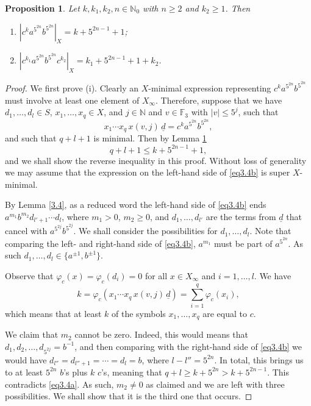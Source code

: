 \documentclass[twoside,11pt]{amsart}
\numberwithin{equation}{section}
\newtheorem{proposition}[theorem]{Proposition}
\theoremstyle{definition}
\newcommand {\N}{\mathbb N}
\newcommand{\1}{\mathbbm{1}}
\newcommand{\F}{\mathbb F}
\newcommand{\pdt}{\underline}
\begin{document}
	\begin{proposition}		\label{3.5}
		Let $k, k_1, k_2, n \in \N_0$ with $n \geq 2$ and $k_2 \geq 1$. Then 
		\begin{enumerate}
			\item[ \rm (i)] $|c^k a^{5^{2n}} b^{5^{2n}}|_X = k + 5^{2n-1} +1$;
			\item[ \rm (ii)] $|c^{k_1} a^{5^{2n}} b^{5^{2n}}c^{k_2}|_X =  k_1+ 5^{2n-1} +1 + k_2$.
		\end{enumerate}
	\end{proposition}
	
	\begin{proof}
		We first prove (i). Clearly an $X$-minimal expression representing $c^k a^{5^{2n}} b^{5^{2n}}$ must involve at least one element of $X_\infty$.
		Therefore, suppose that we have
		$d_1, \ldots, d_l \in S$, $x_1, \ldots ,x_q \in X$, and $j \in \N$ and $ v \in \F_3$ with $|v| \leq 5^j$, such that 
		\begin{equation} 	\label{eq3.4b}
			x_1 \cdots x_q \, x(v,j) \, \pdt{d} = c^k a^{5^{2n}} b^{5^{2n}},
		\end{equation}
		and such that $q+l+1$ is minimal. Then by Lemma \ref{3.5}
		\begin{equation}		\label{eq3.4a}
			q+l+1 \leq k+ 5^{2n-1} +1,
		\end{equation}
		and we shall show the reverse inequality in this proof.
		Without loss of generality we may assume that the expression on the left-hand side of \eqref{eq3.4b} is super $X$-minimal.
		
		By Lemma \ref{3.4}, as a reduced word the left-hand side of \eqref{eq3.4b} ends $a^{m_1}b^{m_2}d_{l'+1}\cdots d_l$, where $m_1> 0$, $m_2 \geq 0$, and $d_1, \ldots , d_{l'}$ are the terms from $\pdt{d}$ that cancel with $a^{5^{2j}}b^{5^{2j}}$. We shall consider the possibilities for $d_1, \ldots, d_{l}$. Note that comparing the left- and right-hand side of \eqref{eq3.4b}, $a^{m_1}$ must be part of $a^{5^{2n}}$. As such $d_1, \ldots, d_l \in \{ a^{\pm 1}, b^{\pm 1} \}$.
		
		Observe that $\varphi_c(x) = \varphi_c(d_i) = 0$ for all $x \in X_\infty$ and $i = 1, \ldots, l$. We have  
		\begin{equation} 	\label{eq3.4d}
			k = \varphi_c(x_1 \cdots x_q \, x(v,j) \, \pdt{d}) = \sum_{i=1}^q \varphi_c(x_i),
		\end{equation} 
		which means that at least $k$ of the symbols $x_1, \ldots, x_q$ are equal to $c$.
		
		We claim that $m_2$ cannot be zero. Indeed, this would means that $d_1, d_2, \ldots, d_{5^{2j}} = b^{-1}$, and then comparing with the right-hand side of \eqref{eq3.4b} we would have 
		$d_{l''} = d_{l''+1} = \cdots =d_{l} = b$, where $l-l'' = 5^{2n}$. In total, this brings us to at least $5^{2n}$ $b$'s plus $k$ $c$'s, meaning that $q+l \geq k+5^{2n} > k + 5^{2n-1}$.
		This contradicts \eqref{eq3.4a}.
		As such, $m_2 \neq 0$ as claimed and we are left with three possibilities. We shall show that it is the third one that occurs.
		

\end{proof}
\end{document}
